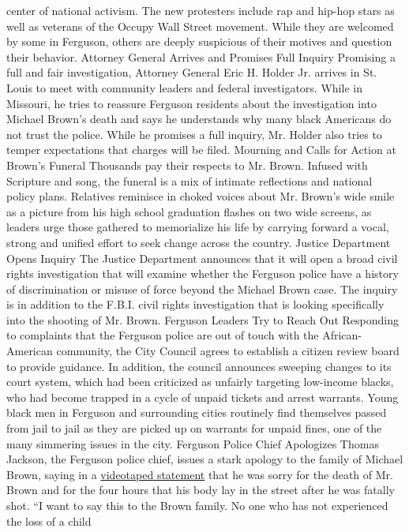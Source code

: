 center of national activism. The new protesters include rap and hip-hop
stars as well as veterans of the Occupy Wall Street movement. While they
are welcomed by some in Ferguson, others are deeply suspicious of their
motives and question their behavior. Attorney General Arrives and
Promises Full Inquiry Promising a full and fair investigation, Attorney
General Eric H. Holder Jr. arrives in St. Louis to meet with community
leaders and federal investigators. While in Missouri, he tries to
reassure Ferguson residents about the investigation into Michael Brown's
death and says he understands why many black Americans do not trust the
police. While he promises a full inquiry, Mr. Holder also tries to
temper expectations that charges will be filed. Mourning and Calls for
Action at Brown's Funeral Thousands pay their respects to Mr. Brown.
Infused with Scripture and song, the funeral is a mix of intimate
reflections and national policy plans. Relatives reminisce in choked
voices about Mr. Brown's wide smile as a picture from his high school
graduation flashes on two wide screens, as leaders urge those gathered
to memorialize his life by carrying forward a vocal, strong and unified
effort to seek change across the country. Justice Department Opens
Inquiry The Justice Department announces that it will open a broad civil
rights investigation that will examine whether the Ferguson police have
a history of discrimination or misuse of force beyond the Michael Brown
case. The inquiry is in addition to the F.B.I. civil rights
investigation that is looking specifically into the shooting of Mr.
Brown. Ferguson Leaders Try to Reach Out Responding to complaints that
the Ferguson police are out of touch with the African-American
community, the City Council agrees to establish a citizen review board
to provide guidance. In addition, the council announces sweeping changes
to its court system, which had been criticized as unfairly targeting
low-income blacks, who had become trapped in a cycle of unpaid tickets
and arrest warrants. Young black men in Ferguson and surrounding cities
routinely find themselves passed from jail to jail as they are picked up
on warrants for unpaid fines, one of the many simmering issues in the
city. Ferguson Police Chief Apologizes Thomas Jackson, the Ferguson
police chief, issues a stark apology to the family of Michael Brown,
saying in a \href{http://vimeo.com/107139488}{videotaped statement} that
he was sorry for the death of Mr. Brown and for the four hours that his
body lay in the street after he was fatally shot. ``I want to say this
to the Brown family. No one who has not experienced the loss of a child
